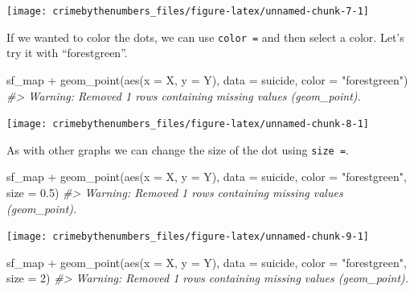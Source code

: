 \documentclass[
]{krantz}
\makeatletter
\newenvironment{Shaded}{\begin{snugshade}}{\end{snugshade}}
\newcommand{\AttributeTok}[1]{\textcolor[rgb]{0.61,0.61,0.61}{#1}}
\newcommand{\CommentTok}[1]{\textcolor[rgb]{0.37,0.37,0.37}{\textit{#1}}}
\newcommand{\DecValTok}[1]{\textcolor[rgb]{0.06,0.06,0.06}{#1}}
\newcommand{\FloatTok}[1]{\textcolor[rgb]{0.06,0.06,0.06}{#1}}
\newcommand{\FunctionTok}[1]{\textcolor[rgb]{0,0,0}{#1}}
\newcommand{\NormalTok}[1]{#1}
\newcommand{\SpecialCharTok}[1]{\textcolor[rgb]{0,0,0}{#1}}
\newcommand{\StringTok}[1]{\textcolor[rgb]{0.5,0.5,0.5}{#1}}
\newenvironment{kframe}{%
\medskip{}
\setlength{\fboxsep}{.8em}
 \def\at@end@of@kframe{}%
 \ifinner\ifhmode%
  \def\at@end@of@kframe{\end{minipage}}%
  \begin{minipage}{\columnwidth}%
 \fi\fi%
 \def\FrameCommand##1{\hskip\@totalleftmargin \hskip-\fboxsep
 \colorbox{shadecolor}{##1}\hskip-\fboxsep
     \hskip-\linewidth \hskip-\@totalleftmargin \hskip\columnwidth}%
 \MakeFramed {\advance\hsize-\width
   \@totalleftmargin\z@ \linewidth\hsize
   \@setminipage}}%
 {\par\unskip\endMakeFramed%
 \at@end@of@kframe}
\renewenvironment{Shaded}{\begin{kframe}}{\end{kframe}}
\makeatother
\begin{document}
\begin{center}\texttt{[image: crimebythenumbers\_files/figure-latex/unnamed-chunk-7-1]} \end{center}

If we wanted to color the dots, we can use \texttt{color\ =} and then select a color. Let's try it with ``forestgreen''.

\begin{Shaded}
\begin{Highlighting}[]
\NormalTok{sf\_map }\SpecialCharTok{+}
  \FunctionTok{geom\_point}\NormalTok{(}\FunctionTok{aes}\NormalTok{(}\AttributeTok{x =}\NormalTok{ X, }\AttributeTok{y =}\NormalTok{ Y),}
             \AttributeTok{data  =}\NormalTok{ suicide,}
             \AttributeTok{color =} \StringTok{"forestgreen"}\NormalTok{)}
\CommentTok{\#\textgreater{} Warning: Removed 1 rows containing missing values (geom\_point).}
\end{Highlighting}
\end{Shaded}

\begin{center}\texttt{[image: crimebythenumbers\_files/figure-latex/unnamed-chunk-8-1]} \end{center}

As with other graphs we can change the size of the dot using \texttt{size\ =}.

\begin{Shaded}
\begin{Highlighting}[]
\NormalTok{sf\_map }\SpecialCharTok{+}
  \FunctionTok{geom\_point}\NormalTok{(}\FunctionTok{aes}\NormalTok{(}\AttributeTok{x =}\NormalTok{ X, }\AttributeTok{y =}\NormalTok{ Y),}
             \AttributeTok{data  =}\NormalTok{ suicide,}
             \AttributeTok{color =} \StringTok{"forestgreen"}\NormalTok{,}
             \AttributeTok{size  =} \FloatTok{0.5}\NormalTok{)}
\CommentTok{\#\textgreater{} Warning: Removed 1 rows containing missing values (geom\_point).}
\end{Highlighting}
\end{Shaded}

\begin{center}\texttt{[image: crimebythenumbers\_files/figure-latex/unnamed-chunk-9-1]} \end{center}

\begin{Shaded}
\begin{Highlighting}[]
\NormalTok{sf\_map }\SpecialCharTok{+}
  \FunctionTok{geom\_point}\NormalTok{(}\FunctionTok{aes}\NormalTok{(}\AttributeTok{x =}\NormalTok{ X, }\AttributeTok{y =}\NormalTok{ Y),}
             \AttributeTok{data  =}\NormalTok{ suicide,}
             \AttributeTok{color =} \StringTok{"forestgreen"}\NormalTok{,}
             \AttributeTok{size  =} \DecValTok{2}\NormalTok{)}
\CommentTok{\#\textgreater{} Warning: Removed 1 rows containing missing values (geom\_point).}
\end{Highlighting}
\end{Shaded}
\end{document}
